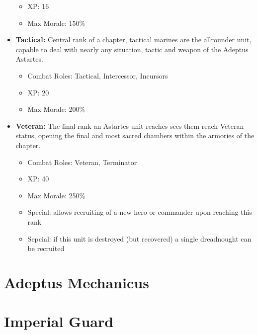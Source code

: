 \begin{itemize}
\begin{itemize}
		\item XP: 16
		\item Max Morale: 150\%
	\end{itemize}
	\item \textbf{Tactical:} Central rank of a chapter, tactical marines are the allrounder unit, capable to deal with nearly any situation, tactic and weapon of the Adeptus Astartes.
	\begin{itemize}
		\item Combat Roles: Tactical, Intercessor, Incursors
		\item XP: 20
		\item Max Morale: 200\%
	\end{itemize}
	\item \textbf{Veteran:} The final rank an Astartes unit reaches sees them reach Veteran status, opening the final and most sacred chambers within the armories of the chapter. 
	\begin{itemize}
		\item Combat Roles: Veteran, Terminator
		\item XP: 40
		\item Max Morale: 250\%
		\item Special: allows recruiting of a new hero or commander upon reaching this rank
		\item Sepcial: if this unit is destroyed (but recovered) a single dreadnought can be recruited
	\end{itemize}
\end{itemize}



\section{Adeptus Mechanicus}

\section{Imperial Guard}

\onecolumn
